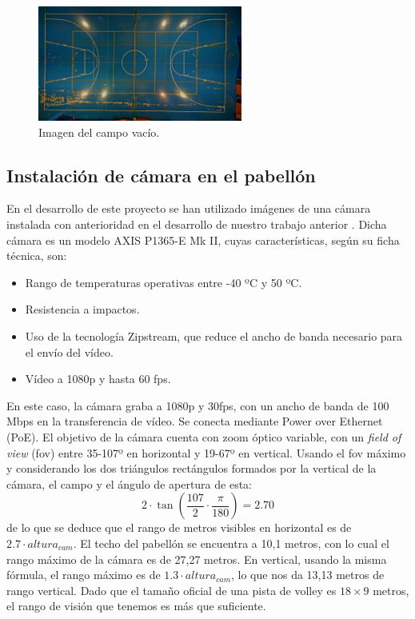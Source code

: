 \begin{figure}
    \centering
    \includegraphics[width=0.6\textwidth]{images/campo}
    \caption{Imagen del campo vacío.}
    \label{fig:campo}
\end{figure}

\subsection{Instalación de cámara en el pabellón}
En el desarrollo de este proyecto se han utilizado imágenes de una cámara instalada con anterioridad en el desarrollo de nuestro trabajo anterior \cite{tfg}. Dicha cámara es un modelo AXIS P1365-E Mk II, cuyas características, según su ficha técnica, son:

\begin{itemize}
    \item Rango de temperaturas operativas entre -40 ºC y 50 ºC.
    \item Resistencia a impactos.
    \item Uso de la tecnología Zipstream, que reduce el ancho de banda necesario para el envío del vídeo.
    \item Vídeo a 1080p y hasta 60 fps.
\end{itemize}

En este caso, la cámara graba a 1080p y 30fps, con un ancho de banda de 100 Mbps en la transferencia de vídeo. Se conecta mediante Power over Ethernet (PoE). El objetivo de la cámara cuenta con zoom óptico variable, con un \textit{field of view} (fov) entre 35-107º en horizontal y 19-67º en vertical. Usando el fov máximo y considerando los dos triángulos rectángulos formados por la vertical de la cámara, el campo y el ángulo de apertura de esta:
\[
    2 \cdot \tan(\frac{107}{2} \cdot \frac{\pi}{180}) = 2.70
\]
de lo que se deduce que el rango de metros visibles en horizontal es de $2.7\cdot altura_{cam}$. El techo del pabellón se encuentra a 10,1 metros, con lo cual el rango máximo de la cámara es de 27,27 metros. En vertical, usando la misma fórmula, el rango máximo es de $1.3 \cdot altura_{cam}$, lo que nos da 13,13 metros de rango vertical. Dado que el tamaño oficial de una pista de volley es $18\times9$ metros, el rango de visión que tenemos es más que suficiente.

